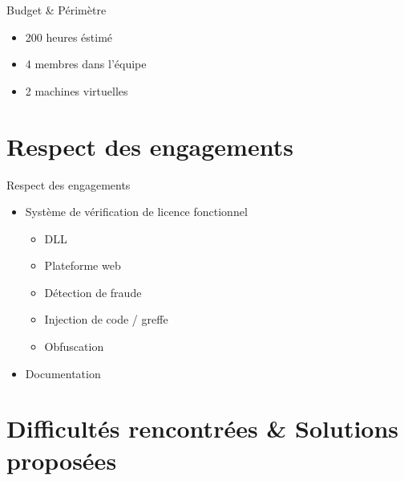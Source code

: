 \documentclass{cubeamer}
\begin{document}
\begin{frame}{Budget \& Périmètre}
    \begin{itemize}
        \item 200 heures éstimé
        \item 4 membres dans l'équipe
        \item 2 machines virtuelles
      \end{itemize}
\end{frame}


\section{Respect des engagements}

\begin{frame}{Respect des engagements}
    \begin{itemize}
        \item Système de vérification de licence fonctionnel
        \begin{itemize}
        \item DLL
        \item Plateforme web
        \item Détection de fraude
        \item Injection de code / greffe 
        \item Obfuscation
        \end{itemize}
        \item Documentation
    \end{itemize}
\end{frame}

\section{Difficultés rencontrées \& Solutions proposées}
\end{document}
